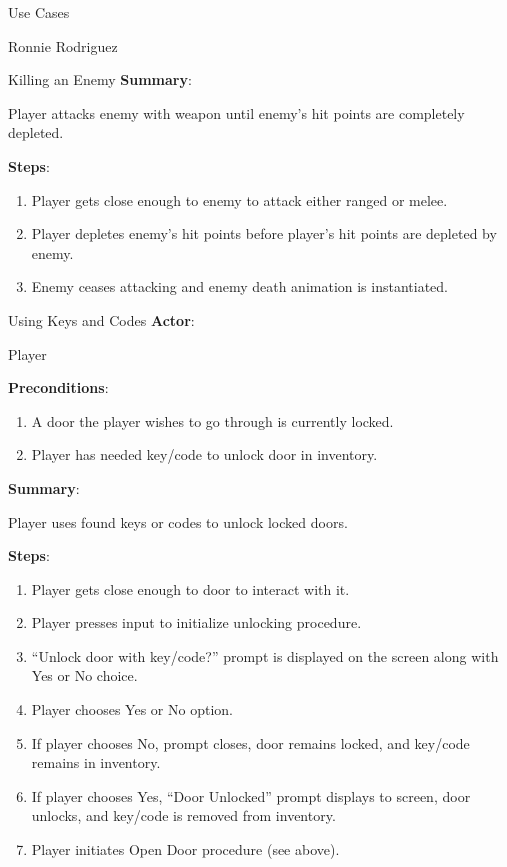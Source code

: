 \documentclass[12pt]{report}
\begin{document}
\begin{section}{Use Cases}
\begin{subsection}{Ronnie Rodriguez}
\begin{subsubsection}{Killing an Enemy}
\textbf{Summary}:

Player attacks enemy with weapon until enemy's hit points are
completely depleted.

\textbf{Steps}:

\begin{enumerate}
\item Player gets close enough to enemy to attack either ranged or melee.
\item Player depletes enemy's hit points before player's hit points are
depleted by enemy.
\item Enemy ceases attacking and enemy death animation is instantiated.
\end{enumerate}
\end{subsubsection}

\begin{subsubsection}{Using Keys and Codes}
\textbf{Actor}:

Player

\textbf{Preconditions}:

\begin{enumerate}
\item A door the player wishes to go through is currently locked.
\item Player has needed key/code to unlock door in inventory.
\end{enumerate}

\textbf{Summary}:

Player uses found keys or codes to unlock locked doors.

\textbf{Steps}:

\begin{enumerate}
\item Player gets close enough to door to interact with it.
\item Player presses input to initialize unlocking procedure.
\item ``Unlock door with key/code?'' prompt is displayed on the screen along
with Yes or No choice.
\item Player chooses Yes or No option.
\item If player chooses No, prompt closes, door remains locked, and key/code
remains in inventory.
\item If player chooses Yes, ``Door Unlocked'' prompt displays to screen,
door unlocks, and key/code is removed from inventory.
\item Player initiates Open Door procedure (see above).
\end{enumerate}
\end{subsubsection}


\end{subsection}
\end{section}
\end{document}
